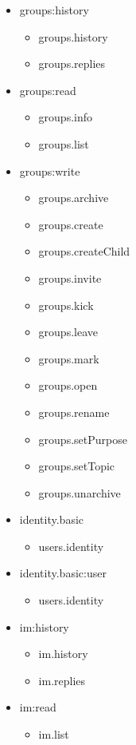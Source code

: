 \begin{multicols}{2}
\begin{itemize}
	\item groups:history
	\begin{itemize}
		\item groups.history
		\item groups.replies
	\end{itemize}
	
	\item groups:read
	\begin{itemize}
		\item groups.info
		\item groups.list
	\end{itemize}
	
	\item groups:write
	\begin{itemize}
		\item groups.archive
		\item groups.create
		\item groups.createChild
		\item groups.invite
		\item groups.kick
		\item groups.leave
		\item groups.mark
		\item groups.open
		\item groups.rename
		\item groups.setPurpose
		\item groups.setTopic
		\item groups.unarchive
	\end{itemize}
	
	\item identity.basic
	\begin{itemize}
		\item users.identity
	\end{itemize}
	
	\item identity.basic:user
	\begin{itemize}
		\item users.identity
	\end{itemize}
	
	\item im:history
	\begin{itemize}
		\item im.history
		\item im.replies
	\end{itemize}
	
	\item im:read
	\begin{itemize}
		\item im.list
	\end{itemize}
	

\end{itemize}
\end{multicols}
